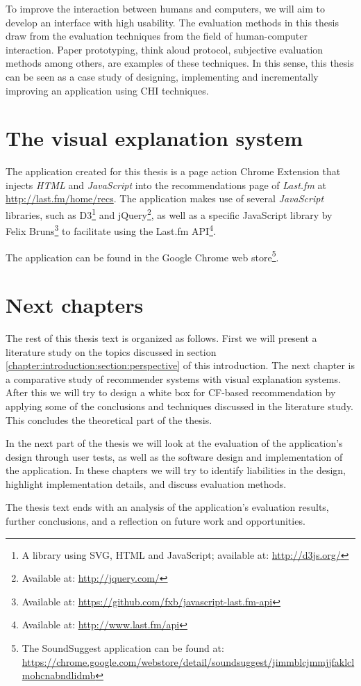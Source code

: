 To improve the interaction between humans and computers, we will aim to develop an interface with high usability. The evaluation methods in this thesis draw from the evaluation techniques from the field of human-computer interaction. Paper prototyping, think aloud protocol, subjective evaluation methods among others, are examples of these techniques\cite{nielsen:1993:UE:529793}. In this sense, this thesis can be seen as a case study of designing, implementing and incrementally improving an application using CHI techniques.


\section{The visual explanation system}\label{chapter:introduction:section:application}

The application created for this thesis is a page action Chrome Extension that injects \emph{HTML} and \emph{JavaScript} into the recommendations page of \emph{Last.fm} at \url{http://last.fm/home/recs}. The application makes use of several \emph{JavaScript} libraries, such as D3\footnote{A library using SVG, HTML and JavaScript\cite{bostock:2012:d3js}; available at: \url{http://d3js.org/}} and jQuery\footnote{Available at: \url{http://jquery.com/}}, as well as a specific JavaScript library by Felix Bruns\footnote{Available at: \url{https://github.com/fxb/javascript-last.fm-api}} to facilitate using the Last.fm API\footnote{Available at: \url{http://www.last.fm/api}}.

The application can be found in the Google Chrome web store\footnote{The SoundSuggest application can be found at: \url{https://chrome.google.com/webstore/detail/soundsuggest/jimmblcjmmjjfaklclmohcnabndlidmb}}.


\section{Next chapters}\label{chapter:introduction:section:chapters}

The rest of this thesis text is organized as follows. First we will present a literature study on the topics discussed in section \ref{chapter:introduction:section:perspective} of this introduction. The next chapter is a comparative study of recommender systems with visual explanation systems. After this we will try to design a white box for CF-based recommendation by applying some of the conclusions and techniques discussed in the literature study. This concludes the theoretical part of the thesis.

In the next part of the thesis we will look at the evaluation of the application's design through user tests, as well as the software design and implementation of the application. In these chapters we will try to identify liabilities in the design, highlight implementation details, and discuss evaluation methods.

The thesis text ends with an analysis of the application's evaluation results, further conclusions, and a reflection on future work and opportunities.
